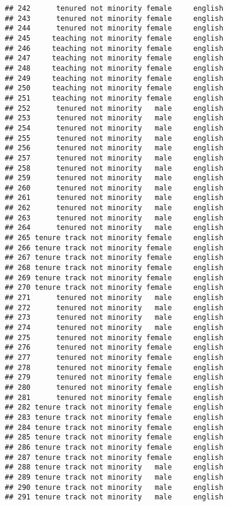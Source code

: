 \documentclass[
]{article}
\begin{document}
\begin{verbatim}
## 242      tenured not minority female     english
## 243      tenured not minority female     english
## 244      tenured not minority female     english
## 245     teaching not minority female     english
## 246     teaching not minority female     english
## 247     teaching not minority female     english
## 248     teaching not minority female     english
## 249     teaching not minority female     english
## 250     teaching not minority female     english
## 251     teaching not minority female     english
## 252      tenured not minority   male     english
## 253      tenured not minority   male     english
## 254      tenured not minority   male     english
## 255      tenured not minority   male     english
## 256      tenured not minority   male     english
## 257      tenured not minority   male     english
## 258      tenured not minority   male     english
## 259      tenured not minority   male     english
## 260      tenured not minority   male     english
## 261      tenured not minority   male     english
## 262      tenured not minority   male     english
## 263      tenured not minority   male     english
## 264      tenured not minority   male     english
## 265 tenure track not minority female     english
## 266 tenure track not minority female     english
## 267 tenure track not minority female     english
## 268 tenure track not minority female     english
## 269 tenure track not minority female     english
## 270 tenure track not minority female     english
## 271      tenured not minority   male     english
## 272      tenured not minority   male     english
## 273      tenured not minority   male     english
## 274      tenured not minority   male     english
## 275      tenured not minority female     english
## 276      tenured not minority female     english
## 277      tenured not minority female     english
## 278      tenured not minority female     english
## 279      tenured not minority female     english
## 280      tenured not minority female     english
## 281      tenured not minority female     english
## 282 tenure track not minority female     english
## 283 tenure track not minority female     english
## 284 tenure track not minority female     english
## 285 tenure track not minority female     english
## 286 tenure track not minority female     english
## 287 tenure track not minority female     english
## 288 tenure track not minority   male     english
## 289 tenure track not minority   male     english
## 290 tenure track not minority   male     english
## 291 tenure track not minority   male     english

\end{verbatim}
\end{document}
